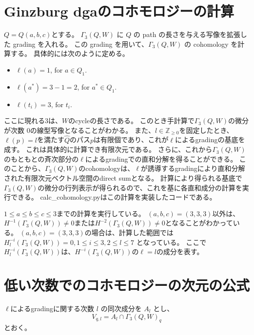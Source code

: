 \documentclass[uplatex,12pt,dvipdfmx]{jsarticle}
\theoremstyle{definition}
\numberwithin{equation}{section}
\newcommand{\Z}{\mathbb{Z}}
\begin{document}
\section{Ginzburg dgaのコホモロジーの計算}

$Q=Q(a,b,c)$とする。
$\Gamma_3(Q, W)$ に $Q$ の path の長さを与える写像を拡張した grading を入れる。
この grading を用いて、$\Gamma_3(Q, W)$ の cohomology を計算する。
具体的には次のように定める。
\begin{itemize}
	\item $\ell(a)=1$, for $a\in Q_1$.
	\item $\ell(a^*)=3-1=2$, for $a^*\in Q_1$.
	\item $\ell(t_i)=3$, for $t_i$.
\end{itemize}
ここに現れる$3$は、$W$のcycleの長さである。
このとき手計算で$\Gamma_3(Q, W)$の微分が次数 $0$の線型写像となることがわかる。
また、$l\in\Z_{\ge 0}$を固定したとき、$\ell(p)=l$を満たす$\hat{Q}$のパス$p$は有限個であり、これが$\ell$によるgradingの基底を成す。
これは具体的に計算でき有限次元である。
さらに、これから$\Gamma_3(Q, W)$のもともとの斉次部分の$\ell$によるgradingでの直和分解を得ることができる。
このことから、$\Gamma_3(Q, W)$のcohomologyは、$\ell$が誘導するgradingにより直和分解された有限次元ベクトル空間のdirect sumとなる。
計算により得られる基底で$\Gamma_3(Q, W)$の微分の行列表示が得られるので、これを基に各直和成分の計算を実行できる。
calc\_cohomology.pyはこの計算を実装したコードである。

$1\le a\le b\le c\le 3$までの計算を実行している。
$(a,b,c) = (3,3,3)$以外は、$H^{-1}(\Gamma_3(Q, W)) \neq 0$または$H^{-2}(\Gamma_3(Q, W)) \neq 0$となることがわかっている。
$(a,b,c) = (3,3,3)$の場合は、計算した範囲では $H^{-i}_l(\Gamma_3(Q, W)) = 0, 1\le i\le 3, 2\le l\le 7 $ となっている。
ここで$H^{-i}_l(\Gamma_3(Q, W))$は、$H^{-i}(\Gamma_3(Q, W))$の$\ell=l$の成分を表す。

\section{低い次数でのコホモロジーの次元の公式}

$\ell$によるgradingに関する次数 $l$ の同次成分を $A_l$ とし、
\begin{equation}
	V_{q,l} = A_l \cap \Gamma_3(Q,W)_q
\end{equation}
とおく。
\end{document}
